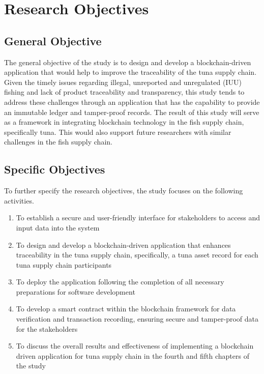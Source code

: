 \section{Research Objectives}
\label{sec:researchobjectives}

\subsection{General Objective}
\label{sec:generalobjective}

The general objective of the study is to design and develop a blockchain-driven application that would help to improve the traceability of the tuna supply chain. Given the timely issues regarding illegal, unreported and unregulated (IUU) fishing and lack of product traceability and transparency,  this study tends to address these challenges through an application that has the capability to provide an immutable ledger and tamper-proof records. The result of this study will serve as a framework in integrating blockchain technology in the fish supply chain, specifically tuna. This would also support future researchers with similar challenges in the fish supply chain.


\subsection{Specific Objectives}
\label{sec:specificobjectives}

To further specify the research objectives, the study focuses on the following activities. 

\begin{enumerate}
	
	\item To establish a secure and user-friendly interface for stakeholders to access and input data into the system
	\item To design and develop a blockchain-driven application that enhances traceability in the tuna supply chain, specifically, a tuna asset record for each tuna supply chain participants
	\item To deploy the application following the completion of all necessary preparations for software development  
	\item To develop a smart contract within the blockchain framework for data verification and transaction recording, ensuring secure and tamper-proof data for the stakeholders 
	\item To discuss the overall results and effectiveness of implementing a blockchain driven application for tuna supply chain in the fourth and fifth chapters of the study
\end{enumerate}


